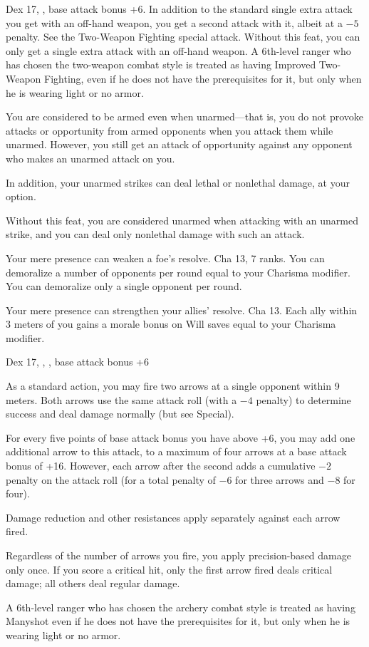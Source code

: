 {}
{Dex 17, , base attack bonus +6.}
{In addition to the standard single extra attack you get with an off-hand weapon, you get a second attack with it, albeit at a $-5$ penalty. See the Two-Weapon Fighting special attack.}
{Without this feat, you can only get a single extra attack with an off-hand weapon.}
{A 6th-level ranger who has chosen the two-weapon combat style is treated as having Improved Two-Weapon Fighting, even if he does not have the prerequisites for it, but only when he is wearing light or no armor.}

{}
{You are considered to be armed even when unarmed---that is, you do not provoke attacks or opportunity from armed opponents when you attack them while unarmed. However, you still get an attack of opportunity against any opponent who makes an unarmed attack on you.

In addition, your unarmed strikes can deal lethal or nonlethal damage, at your option.}
{Without this feat, you are considered unarmed when attacking with an unarmed strike, and you can deal only nonlethal damage with such an attack.}{}

{Your mere presence can weaken a foe's resolve.}
{Cha 13,  7 ranks.}
{You can demoralize a number of opponents per round equal to your Charisma modifier.}
{You can demoralize only a single opponent per round.}{}

{Your mere presence can strengthen your allies' resolve.}
{Cha 13.}
{Each ally within 3 meters of you gains a morale bonus on Will saves equal to your Charisma modifier.}{}{}

{}
{Dex 17, , , base attack bonus +6}
{As a standard action, you may fire two arrows at a single opponent within 9 meters. Both arrows use the same attack roll (with a $-4$ penalty) to determine success and deal damage normally (but see Special).

For every five points of base attack bonus you have above +6, you may add one additional arrow to this attack, to a maximum of four arrows at a base attack bonus of +16. However, each arrow after the second adds a cumulative $-2$ penalty on the attack roll (for a total penalty of $-6$ for three arrows and $-8$ for four).

Damage reduction and other resistances apply separately against each arrow fired.}{}
{Regardless of the number of arrows you fire, you apply precision-based damage only once. If you score a critical hit, only the first arrow fired deals critical damage; all others deal regular damage.

A 6th-level ranger who has chosen the archery combat style is treated as having Manyshot even if he does not have the prerequisites for it, but only when he is wearing light or no armor.}

